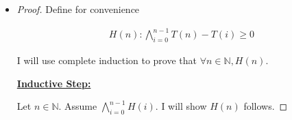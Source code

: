 \documentclass[12pt]{article}
\begin{document}
\begin{itemize}











    \item
    \setcounter{equation}{0}

    \begin{proof}
        Define for convenience

        \begin{align}
            H(n): \bigwedge\limits_{i=0}^{n-1} T(n) - T(i) \geq 0
        \end{align}

        \bigskip

        I will use complete induction to prove that $\forall n \in \mathbb{N}, H(n)$.

        \bigskip

        \underline{\textbf{Inductive Step:}}

        \bigskip

        Let $n \in \mathbb{N}$. Assume $\bigwedge\limits_{i=0}^{n-1}H(i)$. I will
        show $H(n)$ follows.


\end{proof}
\end{itemize}
\end{document}
